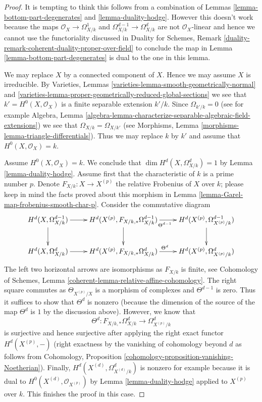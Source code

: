 \documentclass[10pt,a4paper]{amsart}
\theoremstyle{plain}
\theoremstyle{definition}
\theoremstyle{remark}
\numberwithin{equation}{subsection}
\begin{document}
\begin{proof}
It is tempting to think this follows from a combination of
Lemmas \ref{lemma-bottom-part-degenerates} and \ref{lemma-duality-hodge}.
However this doesn't work because the maps $\mathcal{O}_X \to \Omega^1_{X/k}$
and $\Omega^{d - 1}_{X/k} \to \Omega^d_{X/k}$ are not $\mathcal{O}_X$-linear
and hence we cannot use the functoriality discussed in
Duality for Schemes, Remark
\ref{duality-remark-coherent-duality-proper-over-field}
to conclude the map in Lemma \ref{lemma-bottom-part-degenerates}
is dual to the one in this lemma.

\medskip\noindent
We may replace $X$ by a connected component of $X$. Hence we may assume
$X$ is irreducible. By
Varieties, Lemmas \ref{varieties-lemma-smooth-geometrically-normal} and
\ref{varieties-lemma-proper-geometrically-reduced-global-sections}
we see that $k' = H^0(X, \mathcal{O}_X)$ is a finite separable
extension $k'/k$. Since $\Omega_{k'/k} = 0$
(see for example Algebra, Lemma
\ref{algebra-lemma-characterize-separable-algebraic-field-extensions})
we see that $\Omega_{X/k} = \Omega_{X/k'}$
(see Morphisms, Lemma \ref{morphisms-lemma-triangle-differentials}).
Thus we may replace $k$ by $k'$ and assume that $H^0(X, \mathcal{O}_X) = k$.

\medskip\noindent
Assume $H^0(X, \mathcal{O}_X) = k$. We conclude that
$\dim H^d(X, \Omega^d_{X/k}) = 1$ by Lemma \ref{lemma-duality-hodge}.
Assume first that the characteristic of $k$ is a prime number $p$.
Denote $F_{X/k} : X \to X^{(p)}$ the relative Frobenius of $X$ over $k$;
please keep in mind the facts proved about this morphism in
Lemma \ref{lemma-Garel-map-frobenius-smooth-char-p}.
Consider the commutative diagram
$$
\xymatrix{
H^d(X, \Omega^{d - 1}_{X/k}) \ar[d] \ar[r] &
H^d(X^{(p)}, F_{X/k, *}\Omega^{d - 1}_{X/k}) \ar[d] \ar[r]_{\Theta^{d - 1}} &
H^d(X^{(p)}, \Omega^{d - 1}_{X^{(p)}/k}) \ar[d] \\
H^d(X, \Omega^d_{X/k}) \ar[r] &
H^d(X^{(p)}, F_{X/k, *}\Omega^d_{X/k}) \ar[r]^{\Theta^d} &
H^d(X^{(p)}, \Omega^d_{X^{(p)}/k})
}
$$
The left two horizontal arrows are isomorphisms as $F_{X/k}$ is finite, see
Cohomology of Schemes, Lemma \ref{coherent-lemma-relative-affine-cohomology}.
The right square commutes as $\Theta_{X^{(p)}/X}$ is a morphism of
complexes and $\Theta^{d - 1}$ is zero. Thus it suffices to show that
$\Theta^d$ is nonzero (because the dimension of the source of the map
$\Theta^d$ is $1$ by the discussion above). However, we know that
$$
\Theta^d : F_{X/k, *}\Omega^d_{X/k} \to \Omega^d_{X^{(p)}/k}
$$
is surjective and hence surjective after applying the right exact
functor $H^d(X^{(p)}, -)$ (right exactness by the vanishing of cohomology
beyond $d$ as follows from
Cohomology, Proposition \ref{cohomology-proposition-vanishing-Noetherian}).
Finally, $H^d(X^{(d)}, \Omega^d_{X^{(d)}/k})$ is nonzero for example because
it is dual to $H^0(X^{(d)}, \mathcal{O}_{X^{(p)}})$ by
Lemma \ref{lemma-duality-hodge} applied to $X^{(p)}$ over $k$.
This finishes the proof in this case.


\end{proof}
\end{document}
